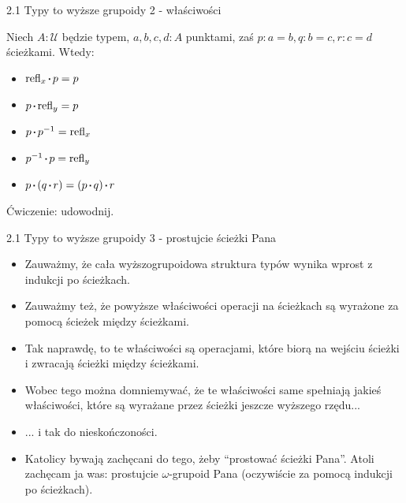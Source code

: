 \documentclass{beamer}
\newcommand{\U}{\mathcal{U}}
\newcommand{\refl}[1]{\text{refl}_{#1}}
\newcommand*\sq{\mathbin{\vcenter{\hbox{\rule{.3ex}{.3ex}}}}}
\begin{document}
\begin{frame}{2.1 Typy to wyższe grupoidy 2 - właściwości}

\begin{theorem}

Niech $A : \U$ będzie typem, $a, b, c, d : A$ punktami, zaś $p : a = b, q : b = c, r : c = d$ ścieżkami. Wtedy:

\begin{itemize}
	\item $\refl{x} \sq p = p$
	\item $p \sq \refl{y} = p$
	\item $p \sq p^{-1} = \refl{x}$
	\item $p^{-1} \sq p = \refl{y}$
	\item $p \sq (q \sq r) = (p \sq q) \sq r$
\end{itemize}

\end{theorem}

Ćwiczenie: udowodnij.

\end{frame}

\begin{frame}{2.1 Typy to wyższe grupoidy 3 - prostujcie ścieżki Pana}
\begin{itemize}
	\item Zauważmy, że cała wyższogrupoidowa struktura typów wynika wprost z indukcji po ścieżkach.
	\item Zauważmy też, że powyższe właściwości operacji na ścieżkach są wyrażone za pomocą ścieżek między ścieżkami.
	\item Tak naprawdę, to te właściwości są operacjami, które biorą na wejściu ścieżki i zwracają ścieżki między ścieżkami.
	\item Wobec tego można domniemywać, że te właściwości same spełniają jakieś właściwości, które są wyrażane przez ścieżki jeszcze wyższego rzędu...
	\item ... i tak do nieskończoności.
	\item Katolicy bywają zachęcani do tego, żeby ``prostować ścieżki Pana''. Atoli zachęcam ja was: prostujcie $\omega$-grupoid Pana (oczywiście za pomocą indukcji po ścieżkach).
\end{itemize}
\end{frame}
\end{document}
